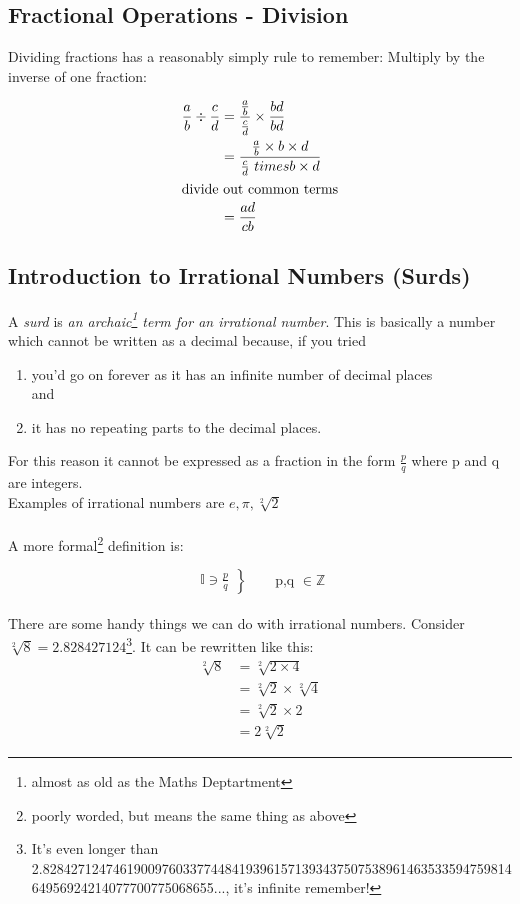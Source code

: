 \subsection{Fractional Operations - Division}
\label{sec:FractionalOperationsDivision}
Dividing fractions has a reasonably simply rule to remember: Multiply by the
inverse of one fraction:

\begin{align}
  \frac{a}{b} \div \frac{c}{d} & = \frac{ \frac{a}{b} }{ \frac{c}{d}} \times
  \frac{bd}{bd} \\
   & = \frac{\frac{a}{b}\times b \times d}{\frac{c}{d} \ times b \times d} \\
  \intertext{divide out common terms}
   & = \frac{ad}{cb}
\end{align}

\newpage
\subsection{Introduction to Irrational Numbers (Surds)}
\label{sec:IntroductionToIrrationalNumbers}
A \emph{surd} is \emph{an archaic\footnote{almost as old as the Maths
Deptartment} term for an irrational number}. This is basically a number which
cannot be written as a decimal because, if you tried
\begin{enumerate}
  \item you'd go on forever as it has an infinite number of decimal places\\
  and
  \item it has no repeating parts to the decimal places.
\end{enumerate}
For this reason it cannot be expressed as a fraction in the form $\frac{p}{q}$
where p and q are integers.\\
Examples of irrational numbers are $e, \pi, \sqrt[2]{2}$\\
\\
A more formal\footnote{poorly worded, but means the same thing as above}
definition is:

\begin{equation*}
\left.\begin{aligned}
  \mathbb{I} \ni \frac{p}{q}
\end{aligned}
\right\} 
\qquad \text{{p,q $\in \mathbb{Z}$}}
\end{equation*}
\\
There are some handy things we can do with irrational numbers. Consider
$\sqrt[2]{8} =
2.828427124$\footnote{It's even longer than
2.828427124746190097603377448419396157139343750753896146353359475981464956924214077700775068655...,
it's infinite remember!}. It can be rewritten like this:
\begin{align}
  \sqrt[2]{8} & = 
    \sqrt[2]{2 \times 4} \\
    & = \sqrt[2]{2} \times \sqrt[2]{4} \\
    & = \sqrt[2]{2} \times 2 \\
    & = 2\sqrt[2]{2}
\end{align}

